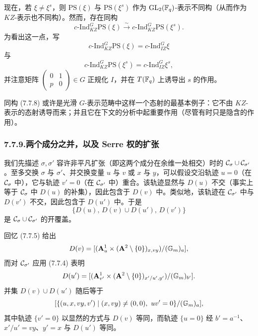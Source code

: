 现在，若 $\xi\neq\xi^s$，则 $\mathrm{PS}(\xi)$ 与 $\mathrm{PS}(\xi^s)$ 作为 $\mathrm{GL}_2(\mathbb{F}_q)$-表示不同构（从而作为 $KZ$-表示也不同构）。然而，存在同构
\begin{equation}\tag{7.7.8}\label{eq:a4-7-7-8}
c\text{-}\mathrm{Ind}^G_{KZ}\mathrm{PS}(\xi)\xrightarrow{\ \sim\ }c\text{-}\mathrm{Ind}^G_{KZ}\mathrm{PS}(\xi^s).
\end{equation}
为看出这一点，写
\[
c\text{-}\mathrm{Ind}^G_{KZ}\mathrm{PS}(\xi)=c\text{-}\mathrm{Ind}^G_{IZ}\xi
\]
与
\[
c\text{-}\mathrm{Ind}^G_{KZ}\mathrm{PS}(\xi^s)=c\text{-}\mathrm{Ind}^G_{IZ}\xi^s,
\]
并注意矩阵 $\begin{pmatrix}0&1\\p&0\end{pmatrix}\in G$ 正规化 $I$，并在 $T(\mathbb{F}_q)$ 上诱导出 $s$ 的作用。

同构 (7.7.8) 或许是光滑 $G$-表示范畴中这样一个态射的最基本例子：它不由 $KZ$-表示的态射诱导而来；并且它在下文的分析中起重要作用（尽管有时只是隐含的作用）。

\subsubsection*{7.7.9.\quad 两个成分之并，以及 Serre 权的扩张}
我们先描述 $\sigma,\sigma'$ 容许非平凡扩张（即这两个成分在余维一处相交）时的 $\mathcal{C}_\sigma\cup\mathcal{C}_{\sigma'}$。至多交换 $\sigma$ 与 $\sigma'$、并交换变量 $u$ 与 $v$ 或 $x$ 与 $y$，可以假设交沿轨迹 $u=0$（在 $\mathcal{C}_\sigma$ 中），它与轨迹 $v'=0$（在 $\mathcal{C}_{\sigma'}$ 中）重合。该轨迹显然与 $D(u)$ 不交（事实上等于 $\mathcal{C}_\sigma$ 中 $D(u)$ 的补集），因此包含于 $D(v)$ 中。类似地，该轨迹在 $\mathcal{C}_{\sigma'}$ 中与 $D(v')$ 不交，因此包含于 $D(u')$ 中。于是
\begin{equation}\tag{7.7.10}\label{eq:a4-7-7-10}
\{D(u),\,D(v)\cup D(u'),\,D(v')\}
\end{equation}
是 $\mathcal{C}_\sigma\cup\mathcal{C}_{\sigma'}$ 的开覆盖。

回忆 (7.7.5) 给出
\[
D(v)=[(\mathbf A^1_u\times(\mathbf A^2\setminus\{0\})_{x,vy})/(\mathbb{G}_m)_a],
\]
而对 $\mathcal{C}_{\sigma'}$ 应用 (7.7.4) 表明
\[
D(u')=[(\mathbf A^1_{v'}\times(\mathbf A^2\setminus\{0\})_{x'/u',y'})/(\mathbb{G}_m)_{b'}].
\]
并集 $D(v)\cup D(u')$ 随后等于
\[
[\{(u,x,vy,v')\mid (x,vy)\neq(0,0),\ uv'=0\}/(\mathbb{G}_m)_a],
\]
其中轨迹 $\{v'=0\}$ 以显然的方式与 $D(v)$ 等同，而轨迹 $\{u=0\}$ 经 $b'=a^{-1}$、$x'/u'=vy$、$y'=x$ 与 $D(u')$ 等同。

